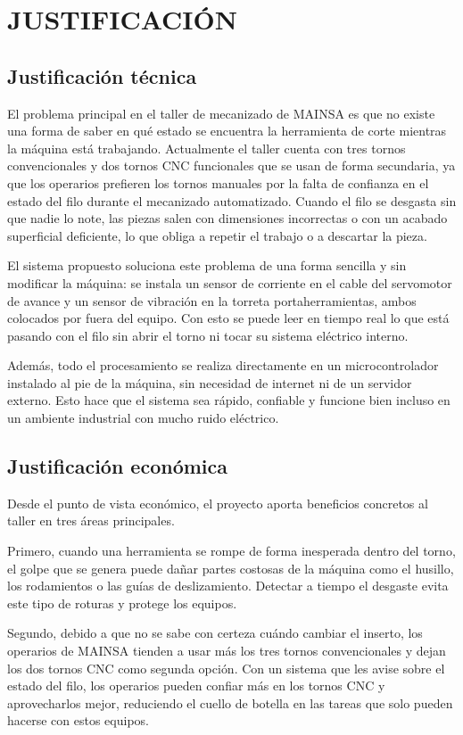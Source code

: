 ﻿\newpage
\section{JUSTIFICACIÓN}

\subsection{Justificación técnica}
El problema principal en el taller de mecanizado de MAINSA es que no existe una forma de saber en qué estado se encuentra la herramienta de corte mientras la máquina está trabajando. Actualmente el taller cuenta con tres tornos convencionales y dos tornos CNC funcionales que se usan de forma secundaria, ya que los operarios prefieren los tornos manuales por la falta de confianza en el estado del filo durante el mecanizado automatizado. Cuando el filo se desgasta sin que nadie lo note, las piezas salen con dimensiones incorrectas o con un acabado superficial deficiente, lo que obliga a repetir el trabajo o a descartar la pieza.

El sistema propuesto soluciona este problema de una forma sencilla y sin modificar la máquina: se instala un sensor de corriente en el cable del servomotor de avance y un sensor de vibración en la torreta portaherramientas, ambos colocados por fuera del equipo. Con esto se puede leer en tiempo real lo que está pasando con el filo sin abrir el torno ni tocar su sistema eléctrico interno.

Además, todo el procesamiento se realiza directamente en un microcontrolador instalado al pie de la máquina, sin necesidad de internet ni de un servidor externo. Esto hace que el sistema sea rápido, confiable y funcione bien incluso en un ambiente industrial con mucho ruido eléctrico.

\subsection{Justificación económica}
Desde el punto de vista económico, el proyecto aporta beneficios concretos al taller en tres áreas principales.

Primero, cuando una herramienta se rompe de forma inesperada dentro del torno, el golpe que se genera puede dañar partes costosas de la máquina como el husillo, los rodamientos o las guías de deslizamiento. Detectar a tiempo el desgaste evita este tipo de roturas y protege los equipos.

Segundo, debido a que no se sabe con certeza cuándo cambiar el inserto, los operarios de MAINSA tienden a usar más los tres tornos convencionales y dejan los dos tornos CNC como segunda opción. Con un sistema que les avise sobre el estado del filo, los operarios pueden confiar más en los tornos CNC y aprovecharlos mejor, reduciendo el cuello de botella en las tareas que solo pueden hacerse con estos equipos.


